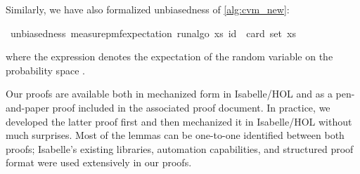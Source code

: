 Similarly, we have also formalized unbiasedness of \cref{alg:cvm_new}:
\begin{isabelle_cm}
\isamarkupfalse%
\ unbiasedness{\isacharcolon}{\kern0pt}\ {\isacartoucheopen}measure{\isacharunderscore}{\kern0pt}pmf{\isachardot}{\kern0pt}expectation\ {\isacharparenleft}{\kern0pt}run{\isacharunderscore}{\kern0pt}algo\ xs{\isacharparenright}{\kern0pt}\ id\ {\isacharequal}{\kern0pt}\ card\ {\isacharparenleft}{\kern0pt}set\ xs{\isacharparenright}{\kern0pt}{\isacartoucheclose}
\end{isabelle_cm}
where the expression  denotes the expectation of the random variable  on the probability space .

Our proofs are available both in mechanized form in Isabelle/HOL and as a pen-and-paper proof included in the associated proof document.
In practice, we developed the latter proof first and then mechanized it in Isabelle/HOL without much surprises.
Most of the lemmas can be one-to-one identified between both proofs; Isabelle's existing libraries, automation capabilities, and structured proof format were used extensively in our proofs.



